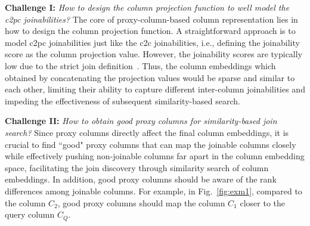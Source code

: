 \textbf{Challenge I: }\textit{How to design the column projection function to well model the c2pc joinabilities?}
The core of proxy-column-based column representation lies in how to design the column projection function.
A straightforward approach is to model c2pc joinabilities just like the c2c  joinabilities, i.e., defining the joinability score as the column projection value.
However, the joinability scores are typically low due to the strict join definition~\cite{Pexeso,Deepjoin}. Thus, the column embeddings which obtained by concatenating the projection values would be sparse and similar to each other, limiting their ability to capture different inter-column  joinabilities and impeding the effectiveness of subsequent similarity-based search.


\textbf{Challenge II: }\textit{How to obtain good proxy columns for similarity-based join search?} 
Since proxy columns directly affect the final column embeddings, it is crucial to find ``good" proxy columns that can map the joinable columns closely while effectively pushing non-joinable columns far apart in the column embedding space, facilitating the join discovery through similarity search of column embeddings.
In addition, good proxy columns should be aware of the   rank differences among joinable columns. For example, in Fig.~\ref{fig:exm1}, compared to the column $C_2$, good proxy columns should map the column $C_1$ closer to the query column $C_Q$.

